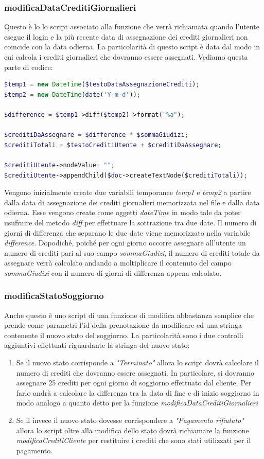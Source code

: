 \documentclass [a4paper, 12pt]{book}
\begin{document}
\subsubsection{modificaDataCreditiGiornalieri}
Questo è lo lo script associato alla funzione che verrà richiamata quando l'utente esegue il login e la più recente data di assegnazione dei crediti giornalieri non coincide con la data odierna. La particolarità di questo script è data dal modo in cui calcola i crediti giornalieri che dovranno essere assegnati. Vediamo questa parte di codice:
\begin{lstlisting}[style=XML , language= PHP] 
$temp1 = new DateTime($testoDataAssegnazioneCrediti);
$temp2 = new DateTime(date('Y-m-d'));

$difference = $temp1->diff($temp2)->format("%a");
    
$creditiDaAssegnare = $difference * $sommaGiudizi;
$creditiTotali = $testoCreditiUtente + $creditiDaAssegnare;

$creditiUtente->nodeValue= "";
$creditiUtente->appendChild($doc->createTextNode($creditiTotali)); 
\end{lstlisting}
Vengono inizialmente create due variabili temporanee \textit{temp1} e \textit{temp2} a partire dalla data di assegnazione dei crediti giornalieri memorizzata nel file e dalla data odierna. Esse vengono create come oggetti \textit{dateTime} in modo tale da poter usufruire del metodo \textit{diff} per effettuare la sottrazione tra due date. Il numero di giorni di differenza che separano le due date viene memorizzato nella variabile \textit{difference}. Dopodiché, poiché per ogni giorno occorre assegnare all'utente un numero di crediti pari al suo campo \textit{sommaGiudizi}, il numero di crediti totale da assegnare verrà calcolato andando a moltiplicare il contenuto del campo \textit{sommaGiudizi} con il numero di giorni di differenza appena calcolato.

\subsubsection{modificaStatoSoggiorno}
Anche questo è uno script di una funzione di modifica abbastanza semplice che prende come parametri l'id della prenotazione da modificare ed una stringa contenente il nuovo stato del soggiorno. La particolarità sono i due controlli aggiuntivi effettuati riguardante la stringa del nuovo stato:
\begin{enumerate}
\item Se il nuovo stato corrisponde a \textit{"Terminato"} allora lo script dovrà calcolare il numero di crediti che dovranno essere assegnati. In particolare, si dovranno assegnare 25 crediti per ogni giorno di soggiorno effettuato dal cliente. Per farlo andrà a calcolare la differenza tra la data di fine e di inizio soggiorno in modo analogo a quanto detto per la funzione \textit{modificaDataCreditiGiornalieri}
\item Se il invece il nuovo stato dovesse corrispondere a \textit{"Pagamento rifiutato"} allora lo script oltre alla modifica dello stato dovrà richiamare la funzione \textit{modificaCreditiCliente} per restituire i crediti che sono stati utilizzati per il pagamento.
\end{enumerate}
\end{document}
